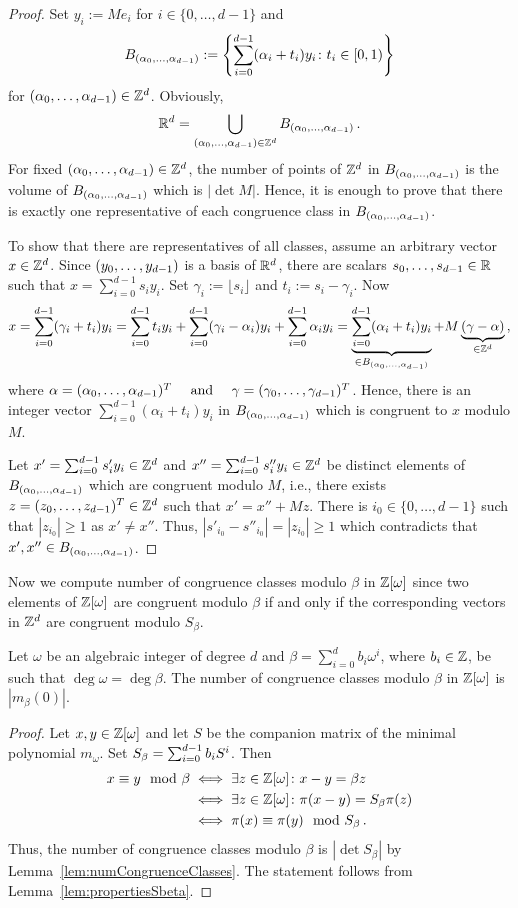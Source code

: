 \begin{proof}
Set $y_i:=M e_i$ for $i\in\{0, \dots, d-1 \}$ and 
$$
B_{({\alpha}_0,\ldots,{\alpha}_{d-1})}:=\left\{\sum_{i=0}^{d-1} (\alpha_i + t_i) y_i \colon t_i \in [0,1)\right\}
$$
for $({\alpha}_0,\ldots,{\alpha}_{d-1}) \in \mathbb{Z}^d$. Obviously,
$$
\mathbb{R}^d=\bigcup_{({\alpha}_0,\ldots,{\alpha}_{d-1}) \in \mathbb{Z}^d} B_{({\alpha}_0,\ldots,{\alpha}_{d-1})}\,.
$$
For fixed $({\alpha}_0,\ldots,{\alpha}_{d-1}) \in \mathbb{Z}^d$, the number of points of $\mathbb{Z}^d$ in $B_{({\alpha}_0,\ldots,{\alpha}_{d-1})}$  is the volume of $B_{({\alpha}_0,\ldots,{\alpha}_{d-1})}$  which is $|\det M|$. Hence, it is enough to prove that there is exactly one representative of each congruence class in $B_{({\alpha}_0,\ldots,{\alpha}_{d-1})}$. 

To show that there are representatives of all classes, assume an arbitrary vector $x\in\mathbb{Z}^d$. Since $({y}_0,\ldots,{y}_{d-1})$ is a basis of $\mathbb{R}^d$, there are scalars $s_0, \dots, s_{d-1}\in \mathbb{R}$ such that $x= \sum_{i=0}^{d-1} s_i y_i$. Set $\gamma_i:=\lfloor s_i \rfloor$ and $t_i:=s_i-\gamma_i$. Now
\begin{align*}
 x=\sum_{i=0}^{d-1} (\gamma_i+t_i) y_i=\sum_{i=0}^{d-1}t_i y_i +\sum_{i=0}^{d-1} (\gamma_i-\alpha_i)y_i + \sum_{i=0}^{d-1} \alpha_i y_i=\underbrace{\sum_{i=0}^{d-1} (\alpha_i+t_i)y_i}_{\in B_{({\alpha}_0,\ldots,{\alpha}_{d-1})} } +M\underbrace{(\gamma-\alpha)}_{\in\mathbb{Z}^d}\,,
\end{align*}
where $\alpha=({\alpha}_0,\ldots,{\alpha}_{d-1})^T \quad \text{ and }\quad \gamma=({\gamma}_0,\ldots,{\gamma}_{d-1})^T$. Hence, there is an integer vector $\sum_{i=0}^{d-1} (\alpha_i+t_i)y_i$ in $B_{({\alpha}_0,\ldots,{\alpha}_{d-1})}$ which is congruent to $x$ modulo $M$.

Let $x'=\sum_{i=0}^{d-1} s'_i y_i \in \mathbb{Z}^d$ and $x''=\sum_{i=0}^{d-1}s''_i y_i \in \mathbb{Z}^d$ be distinct elements of $B_{({\alpha}_0,\ldots,{\alpha}_{d-1})}$ which are congruent modulo $M$, i.e., there exists $z=({z}_0,\ldots,{z}_{d-1})^T\in\mathbb{Z}^d$ such that $x'=x''+M z$. There is $i_0\in\{0, \dots , d-1\}$ such that $|z_{i_0}|\geq 1$ as $x'\neq x''$. Thus, $|s'_{i_0}-s''_{i_0}|=|z_{i_0}|\geq 1$ which contradicts that  $x', x''\in B_{({\alpha}_0,\ldots,{\alpha}_{d-1})}$.
\end{proof}
Now we compute number of congruence classes modulo $\beta$ in $\mathbb{Z}[\omega]$ since two elements of $\mathbb{Z}[\omega]$ are congruent modulo $\beta$ if and only if the corresponding vectors in $\mathbb{Z}^d$ are congruent modulo $S_\beta$.
\begin{thm}
Let $\omega$ be an algebraic integer of degree $d$ and  $\beta=\sum_{i=0}^d b_i \omega^i$, where $b_i\in\mathbb{Z}$, be such that $\deg \omega = \deg\beta$. The number of congruence classes modulo $\beta$ in $\mathbb{Z}[\omega]$ is $|m_\beta(0)|$.
\label{thm:numbCongruenceClasses}
\end{thm}
\begin{proof}
Let $x, y\in\mathbb{Z}[\omega]$ and let $S$ be the companion matrix of the minimal polynomial $m_\omega$. Set $S_\beta=\sum_{i=0}^{d-1} {b}_i S^i$. Then
\begin{align*}
x\equiv y \mod \beta &\iff \exists z \in \mathbb{Z}[\omega] \colon x-y= \beta z \\
&\iff \exists z \in \mathbb{Z}[\omega] \colon \pi(x-y)= S_\beta \pi(z) \\
&\iff \pi(x) \equiv \pi(y) \mod S_\beta\,.
\end{align*}
Thus, the number of congruence classes modulo $\beta$ is $|\det S_\beta|$ by Lemma~\ref{lem:numCongruenceClasses}. The statement follows from Lemma~\ref{lem:propertiesSbeta}. 
\end{proof}